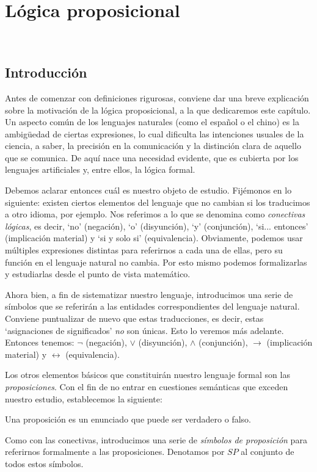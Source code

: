 \chapter{Lógica proposicional}
\\
\section{Introducción}
Antes de comenzar con definiciones rigurosas, conviene dar una breve explicación sobre la motivación de la lógica proposicional, a la que dedicaremos este capítulo. Un aspecto común de los lenguajes naturales (como el español o el chino) es la ambigüedad de ciertas expresiones, lo cual dificulta las intenciones usuales de la ciencia, a saber, la precisión en la comunicación y la distinción clara de aquello que se comunica. De aquí nace una necesidad evidente, que es cubierta por los lenguajes artificiales y, entre ellos, la lógica formal. \

Debemos aclarar entonces cuál es nuestro objeto de estudio. Fijémonos en lo siguiente: existen ciertos elementos del lenguaje que no cambian si los traducimos a otro idioma, por ejemplo. Nos referimos a lo que se denomina como \textit{conectivas lógicas}, es decir, `no' (negación), `o' (disyunción), `y' (conjunción), `si... entonces' (implicación material) y `si y solo si' (equivalencia). Obviamente, podemos usar múltiples expresiones distintas para referirnos a cada una de ellas, pero su función en el lenguaje natural no cambia. Por esto mismo podemos formalizarlas y estudiarlas desde el punto de vista matemático.  

Ahora bien, a fin de sistematizar nuestro lenguaje, introducimos una serie de símbolos que se referirán a las entidades correspondientes del lenguaje natural. Conviene puntualizar de nuevo que estas traducciones, es decir, estas `asignaciones de significados' \textit{no} son únicas. Esto lo veremos más adelante. Entonces tenemos: $\neg$ (negación), $\lor$ (disyunción), $\land$ (conjunción), $\rightarrow$ (implicación material) y $\leftrightarrow$ (equivalencia). \

Los otros elementos básicos que constituirán nuestro lenguaje formal son las \textit{proposiciones}. Con el fin de no entrar en cuestiones semánticas que exceden nuestro estudio, establecemos la siguiente:

\begin{definition}\label{def: prop}
    Una proposición es un enunciado que puede ser verdadero o falso. 
\end{definition}
Como con las conectivas, introducimos una serie de \textit{símbolos de proposición} para referirnos formalmente a las proposiciones. Denotamos por $SP$ al conjunto de todos estos símbolos.

